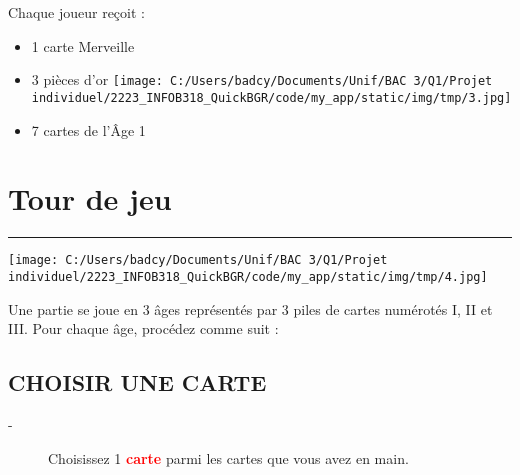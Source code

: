 \documentclass{scrartcl}%
\begin{document}
%

%
Chaque joueur reçoit :
%
\begin{itemize}%
\item%
%
 1 carte Merveille
%
\item%
%
 3 pièces d’or %
\texttt{[image: C:/Users/badcy/Documents/Unif/BAC 3/Q1/Projet individuel/2223\_INFOB318\_QuickBGR/code/my\_app/static/img/tmp/3.jpg]}%

%

%
\item%
%
 7 cartes de l'Âge 1 
%
\end{itemize}

%
\sectionfont{\color{red}}%
\subsectionfont{\color{red}}%
\subsubsectionfont{\color{red}}%
\section{ Tour de jeu
}%
\label{sec:Tourdejeu}%
\textcolor{red}{\rule{18cm}{0.07cm}}\break%
%
\begin{center}\texttt{[image: C:/Users/badcy/Documents/Unif/BAC 3/Q1/Projet individuel/2223\_INFOB318\_QuickBGR/code/my\_app/static/img/tmp/4.jpg]}\end{center}%

%

%
Une partie se joue en 3 âges représentés par 3 piles de cartes numérotés I, II et III. Pour chaque âge, procédez comme suit :


%
\subsection{ CHOISIR UNE CARTE
}%
\label{subsec:CHOISIRUNECARTE}%
\begin{description}%
\item[{-} ]%
%
 Choisissez 1 %
\textcolor{red}{%
\textbf{carte}%
}%
\textit{ }%
 parmi les cartes que vous avez en main.
%
\end{description}

%
\end{document}
